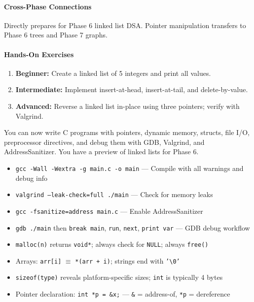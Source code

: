 \documentclass[11pt, a4paper, oneside]{report}
\begin{document}
\paragraph{Cross-Phase Connections} Directly prepares for Phase 6 linked list DSA. Pointer manipulation transfers to Phase 6 trees and Phase 7 graphs.

\paragraph{Hands-On Exercises}
\begin{enumerate}[leftmargin=*]
\item \textbf{Beginner:} Create a linked list of 5 integers and print all values.
\item \textbf{Intermediate:} Implement insert-at-head, insert-at-tail, and delete-by-value.
\item \textbf{Advanced:} Reverse a linked list in-place using three pointers; verify with Valgrind.
\end{enumerate}

\begin{microcheckpoint}
You can now write C programs with pointers, dynamic memory, structs, file I/O, preprocessor directives, and debug them with GDB, Valgrind, and AddressSanitizer. You have a preview of linked lists for Phase 6.
\end{microcheckpoint}

\begin{cheatsheetbox}
\begin{itemize}[leftmargin=*]
\item \texttt{gcc -Wall -Wextra -g main.c -o main} --- Compile with all warnings and debug info
\item \texttt{valgrind --leak-check=full ./main} --- Check for memory leaks
\item \texttt{gcc -fsanitize=address main.c} --- Enable AddressSanitizer
\item \texttt{gdb ./main} then \texttt{break main}, \texttt{run}, \texttt{next}, \texttt{print var} --- GDB debug workflow
\item \texttt{malloc(n)} returns \texttt{void*}; always check for \texttt{NULL}; always \texttt{free()}
\item Arrays: \texttt{arr[i]} $\equiv$ \texttt{*(arr + i)}; strings end with \texttt{'\textbackslash 0'}
\item \texttt{sizeof(type)} reveals platform-specific sizes; \texttt{int} is typically 4 bytes
\item Pointer declaration: \texttt{int *p = \&x;} --- \texttt{\&} = address-of, \texttt{*p} = dereference
\end{itemize}
\end{cheatsheetbox}
\end{document}
